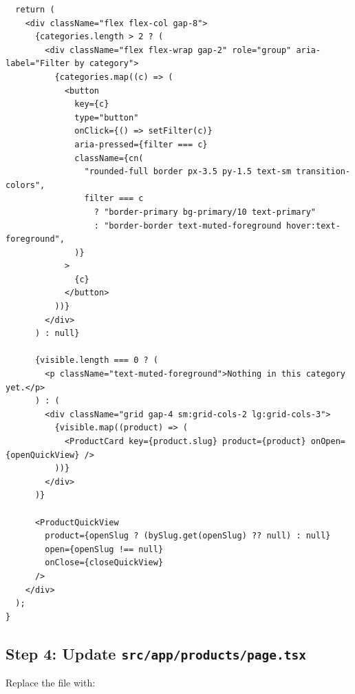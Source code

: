 \documentclass[11pt,a4paper]{article}
\begin{document}
\begin{lstlisting}
  return (
    <div className="flex flex-col gap-8">
      {categories.length > 2 ? (
        <div className="flex flex-wrap gap-2" role="group" aria-label="Filter by category">
          {categories.map((c) => (
            <button
              key={c}
              type="button"
              onClick={() => setFilter(c)}
              aria-pressed={filter === c}
              className={cn(
                "rounded-full border px-3.5 py-1.5 text-sm transition-colors",
                filter === c
                  ? "border-primary bg-primary/10 text-primary"
                  : "border-border text-muted-foreground hover:text-foreground",
              )}
            >
              {c}
            </button>
          ))}
        </div>
      ) : null}

      {visible.length === 0 ? (
        <p className="text-muted-foreground">Nothing in this category yet.</p>
      ) : (
        <div className="grid gap-4 sm:grid-cols-2 lg:grid-cols-3">
          {visible.map((product) => (
            <ProductCard key={product.slug} product={product} onOpen={openQuickView} />
          ))}
        </div>
      )}

      <ProductQuickView
        product={openSlug ? (bySlug.get(openSlug) ?? null) : null}
        open={openSlug !== null}
        onClose={closeQuickView}
      />
    </div>
  );
}
\end{lstlisting}

\subsection*{Step 4: Update \texttt{src/app/products/page.tsx}}

Replace the file with:
\end{document}
